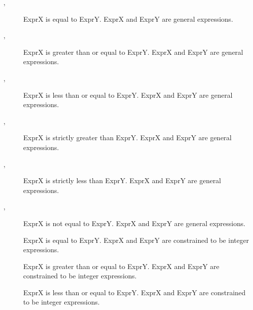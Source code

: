 \begin{description}

\item [,
        ]
ExprX is equal to ExprY.  ExprX and ExprY are general expressions.

\item [,
        ]
ExprX is greater than or equal to ExprY.  ExprX and ExprY are general
expressions.

\item [,
        ]
ExprX is less than or equal to ExprY.  ExprX and ExprY are general expressions.

\item [,
        ]
ExprX is strictly greater than ExprY.  ExprX and ExprY are general
expressions.

\item [,
        ]
ExprX is strictly less than ExprY.  ExprX and ExprY are general expressions.

\item [,
        ]
ExprX is not equal to ExprY.  ExprX and ExprY are general expressions.

\item []
ExprX is equal to ExprY.  ExprX and ExprY are constrained to be integer
expressions.

\item []
ExprX is greater than or equal to ExprY.  ExprX and ExprY are constrained to
be integer expressions.

\item []
ExprX is less than or equal to ExprY.  ExprX and ExprY are constrained to be
integer expressions.


\end{description}
